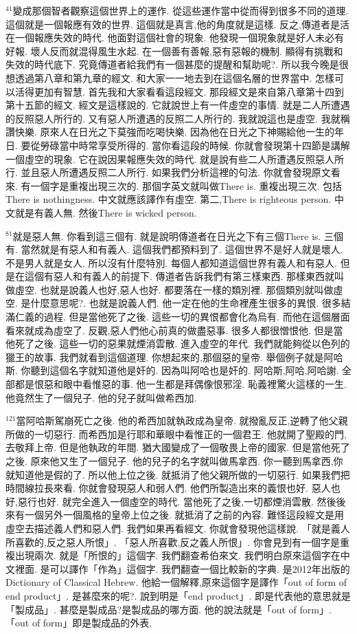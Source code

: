 \documentclass{book}
\begin{document}
$^{41}$變成那個智者觀察這個世界上的運作.
從這些運作當中從而得到很多不同的道理.
這個就是一個報應有效的世界.
這個就是真言,他的角度就是這樣.
反之,傳道者是活在一個報應失效的時代.
他面對這個社會的現象.
他發現一個現象就是好人未必有好報.
壞人反而就混得風生水起.
在一個善有善報,惡有惡報的機制.
顯得有挑戰和失效的時代底下.
究竟傳道者給我們有一個甚麼的提醒和幫助呢?.
所以我今晚是很想透過第八章和第九章的經文.
和大家一一地去到在這個名層的世界當中.
怎樣可以活得更加有智慧.
首先我和大家看看這段經文.
那段經文是來自第八章第十四到第十五節的經文.
經文是這樣說的.
它就說世上有一件虛空的事情.
就是二人所遭遇的反照惡人所行的.
又有惡人所遭遇的反照二人所行的.
我就說這也是虛空.
我就稱讚快樂.
原來人在日光之下莫強而吃喝快樂.
因為他在日光之下神賜給他一生的年日.
要從勞碌當中時常享受所得的.
當你看這段的時候.
你就會發現第十四節是講解一個虛空的現象.
它在說因果報應失效的時代.
就是說有些二人所遭遇反照惡人所行.
並且惡人所遭遇反照二人所行.
如果我們分析這裡的句法.
你就會發現原文看來.
有一個字是重複出現三次的.
那個字英文就叫做There is.
重複出現三次.
包括There is nothingness.
中文就應該譯作有虛空.
第二,There is righteous person.
中文就是有義人無.
然後There is wicked person.

$^{81}$就是惡人無.
你看到這三個有.
就是說明傳道者在日光之下有三個There is.
三個有.
當然就是有惡人和有義人.
這個我們都預料到了.
這個世界不是好人就是壞人.
不是男人就是女人.
所以沒有什麼特別.
每個人都知道這個世界有義人和有惡人.
但是在這個有惡人和有義人的前提下.
傳道者告訴我們有第三樣東西.
那樣東西就叫做虛空.
也就是說義人也好,惡人也好.
都要落在一樣的類別裡.
那個類別就叫做虛空.
是什麼意思呢?.
也就是說義人們.
他一定在他的生命裡產生很多的異恨.
很多結滿仁義的過程.
但是當他死了之後.
這些一切的異恨都會化為烏有.
而他在這個層面看來就成為虛空了.
反觀,惡人們他心前真的做盡惡事.
很多人都很憎恨他.
但是當他死了之後.
這些一切的惡果就煙消雲散.
進入虛空的年代.
我們就能夠從以色列的獵王的故事.
我們就看到這個道理.
你想起來的,那個惡的皇帝.
舉個例子就是阿哈斯.
你聽到這個名字就知道他是奸的.
因為叫阿哈也是奸的.
阿哈斯,阿哈,阿哈謝.
全部都是恨惡和眼中看惟惡的事.
他一生都是拜偶像恨邪淫.
恥義裡驚火這樣的一生.
他竟然生了一個兒子.
他的兒子就叫做希西加.

$^{121}$當阿哈斯駕崩死亡之後.
他的希西加就執政成為皇帝.
就撥亂反正,逆轉了他父親所做的一切惡行.
而希西加是行耶和華眼中看惟正的一個君王.
他就開了聖殿的門,去敬拜上帝.
但是他執政的年間.
猶大國變成了一個敬畏上帝的國家.
但是當他死了之後.
原來他又生了一個兒子.
他的兒子的名字就叫做馬拿西.
你一聽到馬拿西,你就知道他是假的了.
所以他上位之後.
就抵消了他父親所做的一切惡行.
如果我們把時間線拉長來看.
你就會發現惡人和弱人們.
他們所製造出來的義恨也好.
惡人也好,惡行也好.
就完全進入一個虛空的時代.
當他死了之後,一切都煙消雲散.
然後後來有一個另外一個風格的皇帝上位之後.
就抵消了之前的內容.
難怪這段經文是用虛空去描述義人們和惡人們.
我們如果再看經文.
你就會發現他這樣說.
「就是義人所喜歡的,反之惡人所恨」.
「惡人所喜歡,反之義人所恨」.
你會見到有一個字是重複出現兩次.
就是「所恨的」這個字.
我們翻查希伯來文.
我們明白原來這個字在中文裡面.
是可以譯作「作為」這個字.
我們翻查一個比較新的字典.
是2012年出版的Dictionary of Classical Hebrew.
他給一個解釋,原來這個字是譯作「out of form of end product」.
是甚麼來的呢?.
說到明是「end product」.
即是代表他的意思就是「製成品」.
甚麼是製成品?是製成品的哪方面.
他的說法就是「out of form」.
「out of form」即是製成品的外表.
\end{document}

